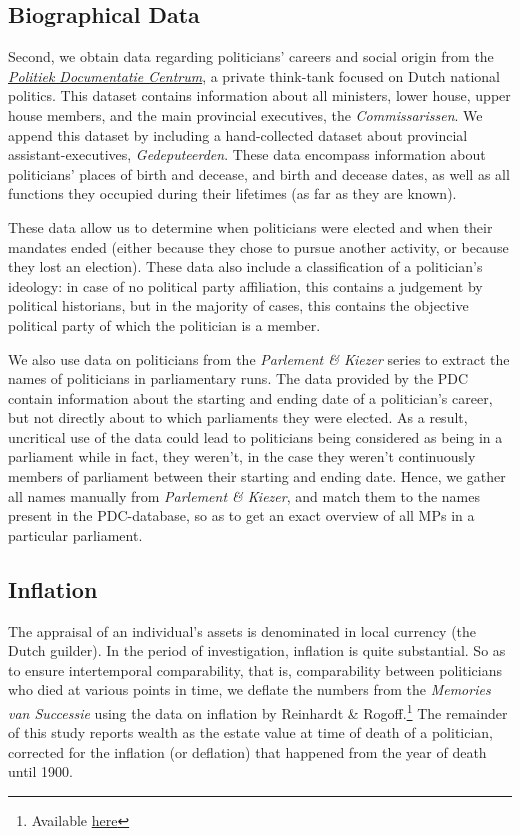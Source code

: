 \subsection{Biographical Data}
Second, we obtain data regarding politicians' careers and social origin from the \href{www.pdc.nl}{\textit{Politiek Documentatie Centrum}}, a private think-tank focused on Dutch national politics. This dataset contains information about all ministers, lower house, upper house members, and the main provincial executives, the \textit{Commissarissen}. We append this dataset by including a hand-collected dataset about provincial assistant-executives, \textit{Gedeputeerden}. These data encompass information about politicians' places of birth and decease, and birth and decease dates, as well as all functions they occupied during their lifetimes (as far as they are known). 

These data allow us to determine when politicians were elected and when their mandates ended (either because they chose to pursue another activity, or because they lost an election). These data also include a classification of a politician's ideology: in case of no political party affiliation, this contains a judgement by political historians, but in the majority of cases, this contains the objective political party of which the politician is a member. 

We also use data on politicians from the \textit{Parlement \& Kiezer} series to extract the names of politicians in parliamentary runs. The data provided by the PDC contain information about the starting and ending date of a politician's career, but not directly about to which parliaments they were elected. As a result, uncritical use of the data could lead to politicians being considered as being in a parliament while in fact, they weren't, in the case they weren't continuously members of parliament between their starting and ending date. Hence, we gather all names manually from \textit{Parlement \& Kiezer}, and match them to the names present in the PDC-database, so as to get an exact overview of all MPs in a particular parliament. 

\subsection{Inflation}
The appraisal of an individual's assets is denominated in local currency (the Dutch guilder). In the period of investigation, inflation is quite substantial. So as to ensure intertemporal comparability, that is, comparability between politicians who died at various points in time, we deflate the numbers from the \textit{Memories van Successie} using the data on inflation by Reinhardt \& Rogoff.\footnote{Available \href{https://carmenreinhart.com/2020/02/netherlands/}{here}} The remainder of this study reports wealth as the estate value at time of death of a politician, corrected for the inflation (or deflation) that happened from the year of death until 1900. 

